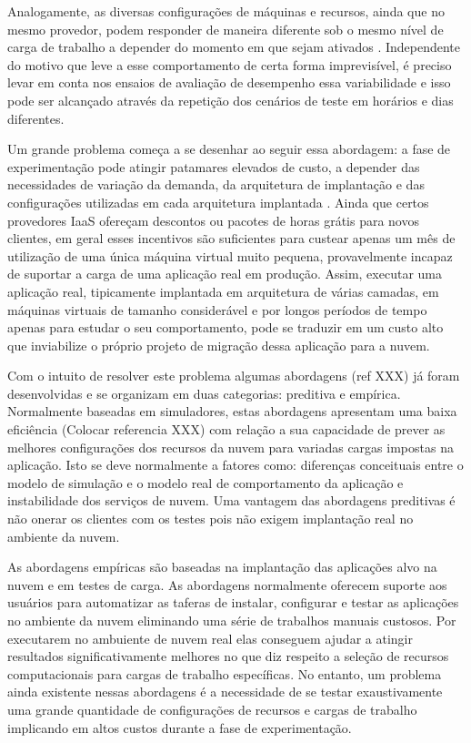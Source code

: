 Analogamente, as diversas configurações de máquinas e recursos, ainda que no mesmo provedor, 
podem responder de maneira diferente sob o mesmo nível de carga de trabalho a depender 
do momento em que sejam ativados \cite{cunha2011investigating, iosup2011performance, 
jayasinghe2011variations}. Independente do motivo que leve a esse comportamento de certa 
forma imprevisível, é preciso levar em conta nos ensaios de avaliação de desempenho essa 
variabilidade e isso pode ser alcançado através da repetição dos cenários de teste em horários 
e dias diferentes.

Um grande problema começa a se desenhar ao seguir essa abordagem: a fase de
experimentação pode atingir patamares elevados de custo, a depender das
necessidades de variação da demanda, da arquitetura de implantação e das configurações utilizadas 
em cada arquitetura implantada 
\cite{silva2013cloudbench}. Ainda que certos provedores IaaS ofereçam descontos ou pacotes de 
horas grátis para novos clientes, em geral esses incentivos são suficientes para custear apenas 
um mês de utilização de uma única máquina virtual muito pequena, provavelmente incapaz de suportar 
a carga de uma aplicação real em produção. Assim, executar uma aplicação real, tipicamente 
implantada em arquitetura de várias camadas, em máquinas virtuais de tamanho considerável e por 
longos períodos de tempo apenas para estudar o seu comportamento, pode se traduzir em um custo 
alto que inviabilize o próprio projeto de migração dessa aplicação para a nuvem. 

Com o intuito de resolver este problema algumas abordagens (ref XXX) já
foram desenvolvidas e se organizam em duas categorias: preditiva e empírica.
Normalmente baseadas em simuladores, estas abordagens apresentam uma baixa
eficiência (Colocar referencia XXX) com relação a sua capacidade de prever as
melhores configurações dos recursos da nuvem para variadas cargas impostas na aplicação. Isto se deve
normalmente a fatores como: diferenças conceituais entre o modelo de simulação e
o modelo real de comportamento da aplicação e instabilidade dos serviços de
nuvem. Uma vantagem das abordagens preditivas é não onerar os clientes com os
testes pois não exigem implantação real no ambiente da nuvem.

As abordagens empíricas são baseadas na implantação das aplicações alvo na nuvem 
e em testes de carga. As abordagens normalmente oferecem suporte aos usuários
para automatizar as taferas de instalar, configurar e testar as aplicações no
ambiente da nuvem eliminando uma série de trabalhos manuais custosos. Por
executarem no ambuiente de nuvem real elas conseguem ajudar a atingir resultados
significativamente melhores no que diz respeito a seleção de recursos
computacionais para cargas de trabalho específicas. No entanto, um problema ainda existente nessas abordagens
é a necessidade de se testar exaustivamente uma grande quantidade de
configurações de recursos e cargas de trabalho implicando em altos custos
durante a fase de experimentação.

